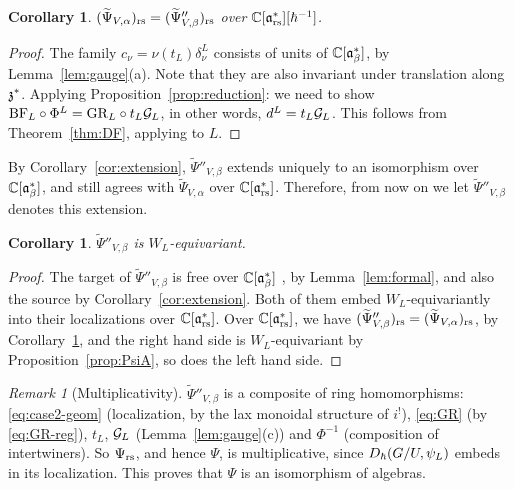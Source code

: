 \documentclass{article}
\theoremstyle{plain}
\newtheorem{corollary}[theorem]{Corollary}
\theoremstyle{definition}
\theoremstyle{remark}
\newtheorem{remark}[theorem]{Remark}
\numberwithin{equation}{section}
\begin{document}
\begin{corollary}\label{cor:rs-compat}
$(\widetilde\Psi_{V,\alpha})_{\mathrm{rs}}=(\widetilde\Psi''_{V,\beta})_{\mathrm{rs}}$ over $\mathbb{C}[\mathfrak{a}^*_{\mathrm{rs}}][\hbar^{-1}]$.
\end{corollary}

\begin{proof}
The family $c_\nu=\nu(t_L)\delta^L_\nu$ consists of units of $\mathbb{C}[\mathfrak{a}^*_{\beta}]$, by Lemma~\ref{lem:gauge}(a). Note that they are also invariant under translation along $\mathfrak{z}^*$. Applying Proposition~\ref{prop:reduction}: we need to show $\mathrm{BF}_L\circ\Phi^L=\mathrm{GR}_L\circ t_L\mathcal G_L$, in other words, $d^L=t_L\mathcal G_L$. This follows from Theorem~\ref{thm:DF}, applying to $L$.
\end{proof}

By Corollary~\ref{cor:extension}, $\widetilde\Psi''_{V,\beta}$ extends uniquely to an isomorphism over $\mathbb{C}[\mathfrak{a}^*_{\beta}]$, and still agrees with $\widetilde\Psi_{V,\alpha}$ over $\mathbb{C}[\mathfrak{a}^*_{\mathrm{rs}}]$. Therefore, from now on we let $\widetilde\Psi''_{V,\beta}$ denotes this extension.

\begin{corollary}\label{cor:WL}
$\widetilde\Psi''_{V,\beta}$ is $W_L$-equivariant.
\end{corollary}

\begin{proof}
The target of $\widetilde\Psi''_{V,\beta}$ is free over $\mathbb{C}[\mathfrak{a}^*_{\beta}]$ , by Lemma~\ref{lem:formal}, and also the source by Corollary~\ref{cor:extension}. Both of them embed $W_L$-equivariantly into their localizations over $\mathbb{C}[\mathfrak{a}^*_{\mathrm{rs}}]$. Over $\mathbb{C}[\mathfrak{a}^*_{\mathrm{rs}}]$, we have $(\widetilde\Psi''_{V,\beta})_{\mathrm{rs}}=(\widetilde\Psi_{V,\alpha})_{\mathrm{rs}}$, by Corollary~\ref{cor:rs-compat}, and the right hand side is $W_L$-equivariant by Proposition~\ref{prop:PsiA}, so does the left hand side.
\end{proof}

\begin{remark}[Multiplicativity]\label{rem:mult}
$\widetilde\Psi''_{V,\beta}$ is a composite of ring homomorphisms: \eqref{eq:case2-geom} (localization, by the lax monoidal structure of $i^!$), \eqref{eq:GR} (by \eqref{eq:GR-reg}), $t_L$, $\mathcal G_L$ (Lemma~\ref{lem:gauge}(c)) and $\Phi^{-1}$ (composition of intertwiners). So $\Psi_{\mathrm{rs}}$, and hence $\Psi$, is multiplicative, since $D_\hbar(G/U,\psi_L)$ embeds in its localization. This proves that $\Psi$ is an isomorphism of algebras.
\end{remark}
\end{document}
